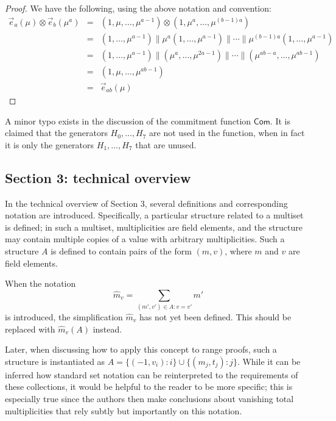 \documentclass{article}
\begin{document}
\begin{proof}
	We have the following, using the above notation and convention:
	\begin{eqnarray*}
		\vec{e}_a(\mu) \otimes \vec{e}_b(\mu^a) &=& (1, \mu, \ldots, \mu^{a-1}) \otimes (1, \mu^a, \ldots, \mu^{(b-1)a}) \\
		&=& (1, \ldots, \mu^{a-1}) \| \mu^a (1, \ldots, \mu^{a-1}) \| \cdots \| \mu^{(b-1)a} (1, \ldots, \mu^{a-1}) \\
		&=& (1, \ldots, \mu^{a-1}) \| (\mu^a, \ldots, \mu^{2a-1}) \| \cdots \| (\mu^{ab-a}, \ldots, \mu^{ab-1}) \\
		&=& (1, \mu, \ldots, \mu^{ab-1}) \\
		&=& \vec{e}_{ab}(\mu)
	\end{eqnarray*}
\end{proof}

A minor typo exists in the discussion of the commitment function $\mathsf{Com}$.
It is claimed that the generators $H_0, \ldots, H_7$ are not used in the function, when in fact it is only the generators $H_1, \ldots, H_7$ that are unused.


\subsection{Section 3: technical overview}

In the technical overview of Section 3, several definitions and corresponding notation are introduced.
Specifically, a particular structure related to a multiset is defined; in such a multiset, multiplicities are field elements, and the structure may contain multiple copies of a value with arbitrary multiplicities.
Such a structure $A$ is defined to contain pairs of the form $(m, v)$, where $m$ and $v$ are field elements.

When the notation
$$\hat{m}_v = \sum_{(m', v') \in A : v = v'} m'$$
is introduced, the simplification $\hat{m}_v$ has not yet been defined.
This should be replaced with $\hat{m}_v(A)$ instead.

Later, when discussing how to apply this concept to range proofs, such a structure is instantiated as $A = \{ (-1, v_i) : i \} \cup \{ (m_j, t_j) : j \}$.
While it can be inferred how standard set notation can be reinterpreted to the requirements of these collections, it would be helpful to the reader to be more specific; this is especially true since the authors then make conclusions about vanishing total multiplicities that rely subtly but importantly on this notation.
\end{document}
